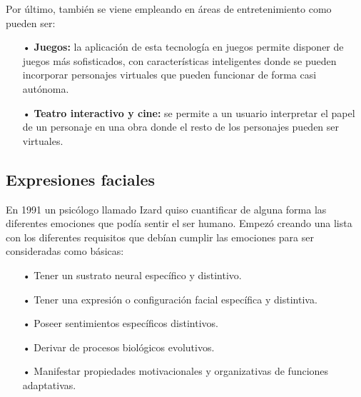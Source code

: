 Por último, también se viene empleando en áreas de entretenimiento como pueden ser:

\begin{itemize}
\item[•] {\bf Juegos:} 
la aplicación de esta tecnología en juegos permite disponer de juegos más sofisticados, con características inteligentes donde se pueden incorporar personajes virtuales que pueden funcionar de forma casi autónoma.

\item[•] {\bf Teatro interactivo y cine:} 
se permite a un usuario interpretar el papel de un personaje en una obra donde el resto de los personajes pueden ser virtuales.
\end{itemize}

\subsection{Expresiones faciales}

En 1991 un psicólogo llamado Izard quiso cuantificar de alguna forma las diferentes emociones que podía sentir el ser humano. Empezó creando una lista con los diferentes requisitos que debían cumplir las emociones para ser consideradas como básicas:

\begin{itemize}
\item[•] Tener un sustrato neural específico y distintivo.
\item[•] Tener una expresión o configuración facial específica y distintiva.
\item[•] Poseer sentimientos específicos distintivos.
\item[•] Derivar de procesos biológicos evolutivos.
\item[•] Manifestar propiedades motivacionales y organizativas de funciones adaptativas.
\end{itemize}

